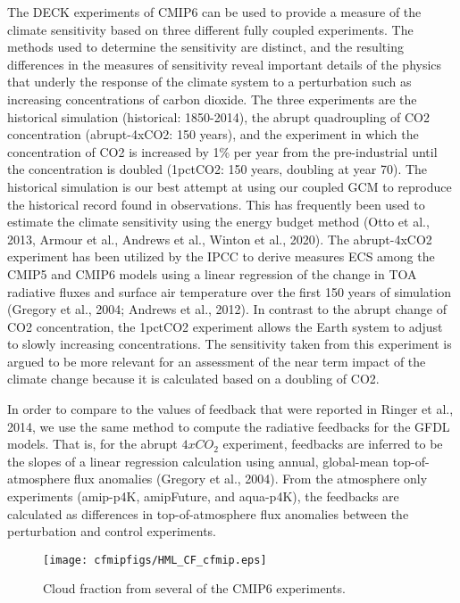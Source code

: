 \documentclass[11pt]{article}   	%
\begin{document}
The DECK experiments of CMIP6 can be used to provide a measure of the climate sensitivity based on 
three different fully coupled experiments.  The methods used to determine the sensitivity are distinct, and the resulting 
differences in the measures of sensitivity reveal important details of the physics that underly the response
of the climate system to a perturbation such as increasing concentrations of carbon dioxide.  The three 
experiments are the historical simulation (historical: 1850-2014),  the abrupt quadroupling of CO2 concentration 
 (abrupt-4xCO2: 150 years), and the experiment in which the concentration of CO2 is increased by 1\% 
 per year from the pre-industrial until the concentration is doubled (1pctCO2: 150 years, doubling at year 70).  
The historical simulation is our best attempt at using our coupled GCM to reproduce the historical 
record found in observations.  This has frequently been used to estimate the climate sensitivity using the 
energy budget method (Otto et al., 2013, Armour et al., Andrews et al., Winton et al., 2020).  The abrupt-4xCO2
experiment has been utilized by the IPCC to derive measures ECS among the CMIP5 and CMIP6 models
using a linear regression of the change in TOA radiative fluxes and surface air temperature over the first 
150 years of simulation (Gregory et al., 2004; Andrews et al., 2012).  In contrast to the abrupt change of 
CO2 concentration, the 1pctCO2 experiment allows the Earth system to adjust to slowly increasing concentrations.  
The sensitivity taken from this experiment is argued to be more relevant for an assessment of the 
near term impact of the climate change because it is calculated based on a doubling of CO2.    


In order to compare to the values of feedback that were reported in Ringer et al., 2014, we use the same method 
to compute the radiative feedbacks for the GFDL models.  That is, for the abrupt $4xCO_{2}$ experiment, feedbacks are 
inferred to be the slopes of a linear regression calculation using annual, global-mean top-of-atmosphere flux anomalies 
(Gregory et al., 2004).  From the atmosphere only experiments (amip-p4K, amipFuture, and aqua-p4K), the feedbacks 
are calculated as 
differences in top-of-atmosphere flux anomalies between the perturbation and control experiments.   

\begin{figure}
  \texttt{[image: cfmipfigs/HML\_CF\_cfmip.eps]}
  \caption{Cloud fraction from several of the CMIP6 experiments.}
  \label{fig:cf_hml_manyexps}
\end{figure}
\end{document}
